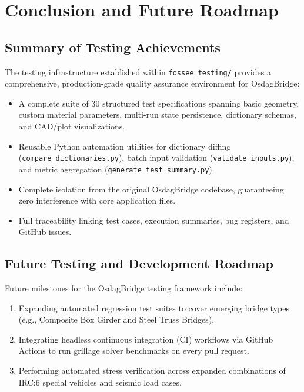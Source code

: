 \chapter{Conclusion and Future Roadmap}
\label{chap:conclusion}

\section{Summary of Testing Achievements}
The testing infrastructure established within \texttt{fossee\_testing/} provides a comprehensive, production-grade quality assurance environment for OsdagBridge:
\begin{itemize}
    \item A complete suite of 30 structured test specifications spanning basic geometry, custom material parameters, multi-run state persistence, dictionary schemas, and CAD/plot visualizations.
    \item Reusable Python automation utilities for dictionary diffing (\texttt{compare\_dictionaries.py}), batch input validation (\texttt{validate\_inputs.py}), and metric aggregation (\texttt{generate\_test\_summary.py}).
    \item Complete isolation from the original OsdagBridge codebase, guaranteeing zero interference with core application files.
    \item Full traceability linking test cases, execution summaries, bug registers, and GitHub issues.
\end{itemize}

\section{Future Testing and Development Roadmap}
Future milestones for the OsdagBridge testing framework include:
\begin{enumerate}
    \item Expanding automated regression test suites to cover emerging bridge types (e.g., Composite Box Girder and Steel Truss Bridges).
    \item Integrating headless continuous integration (CI) workflows via GitHub Actions to run grillage solver benchmarks on every pull request.
    \item Performing automated stress verification across expanded combinations of IRC:6 special vehicles and seismic load cases.
\end{enumerate}
